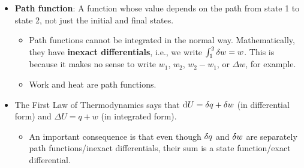 \documentclass[../notes.tex]{subfiles}
\begin{document}
\begin{itemize}
\begin{itemize}
        \item Reversible compression/expansion (Figure \ref{fig:isothermalManipulationc}).
        \begin{itemize}
            \item In a very slow manner, incrementally increase (resp. decrease) $P_\text{ext}$ so as to allow the gas to reversibly compress (resp. expand).
            \item Compressing a gas reversibly and isothermally does the minimum amount of work on the gas. Expanding a gas reversibly and isothermally requires the gas to do the maximum amount of work.
        \end{itemize}
        \item This work done on the gas raises the internal energy of the system, right? So shouldn't that raise the temperature, making the process not isothermal?
        \item Where does the extra energy above and below the isotherm in the irreversible processes go? Is it converted to heat?
        \item Does this mean that if you used a \SI{1000}{\kilo\gram} weight to compress a gas to half its original volume vs. using a \SI{10}{\kilo\gram} weight to compress a gas to half its original volume, the gas would get 100 times hotter in the former case?
    \end{itemize}
    \item \textbf{Path function}: A function whose value depends on the path from state 1 to state 2, not just the initial and final states.
    \begin{itemize}
        \item Path functions cannot be integrated in the normal way. Mathematically, they have \textbf{inexact differentials}, i.e., we write $\int_1^2\var{w}=w$. This is because it makes no sense to write $w_1$, $w_2$, $w_2-w_1$, or $\Delta w$, for example.
        \item Work and heat are path functions.
    \end{itemize}
    \item The First Law of Thermodynamics says that $\dd{U}=\var{q}+\var{w}$ (in differential form) and $\Delta U=q+w$ (in integrated form).
    \begin{itemize}
        \item An important consequence is that even though $\var{q}$ and $\var{w}$ are separately path functions/inexact differentials, their sum is a state function/exact differential.
    \end{itemize}

\end{itemize}
\end{document}
